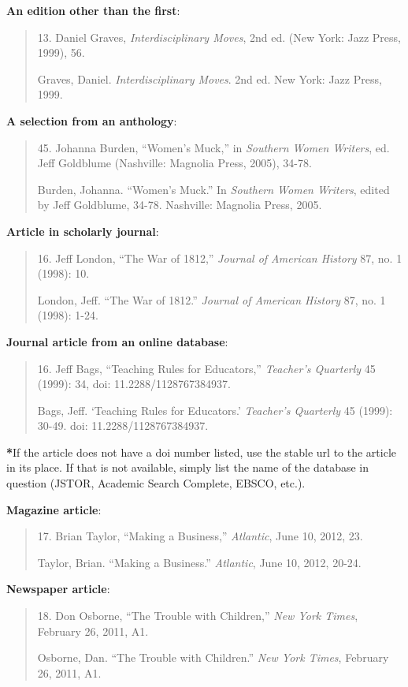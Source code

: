 \textbf{An edition other than the first}:

\begin{quote}
 13. Daniel Graves, \emph{Interdisciplinary Moves}, 2nd ed. (New York: Jazz Press, 1999), 56.

Graves, Daniel. \emph{Interdisciplinary Moves}. 2nd ed. New York: Jazz Press,  1999.
\end{quote}

\textbf{A selection from an anthology}:
\begin{quote}

 45. Johanna Burden, ``Women's Muck,'' in \emph{Southern Women Writers}, ed. Jeff Goldblume (Nashville: Magnolia Press, 2005), 34-78.

Burden, Johanna. ``Women's Muck.'' In \emph{Southern Women Writers},  edited by Jeff Goldblume, 
34-78. Nashville: Magnolia Press, 2005.
\end{quote}

\textbf{Article in scholarly journal}:
\begin{quote}
 16. Jeff London, ``The War of 1812,'' \emph{Journal of American History} 87, no. 1 (1998): 10.

London, Jeff. ``The War of 1812.'' \emph{Journal of American History} 87, no.  1 (1998): 1-24.
\end{quote}

\textbf{Journal article from an online database}:
\begin{quote}

 16. Jeff Bags, ``Teaching Rules for Educators,'' \emph{Teacher's Quarterly} 45 (1999): 34, doi: 11.2288/1128767384937.

Bags, Jeff. `Teaching Rules for Educators.' \emph{Teacher's Quarterly} 45  (1999): 30-49. doi: 11.2288/1128767384937.
\end{quote}

\textbf{*}If the article does not have a doi number listed, use the stable url to the article in its place. If that is not available, simply list the name of the database in question (JSTOR, Academic Search Complete, EBSCO, etc.).


\textbf{Magazine article}:
\begin{quote}
 17. Brian Taylor, ``Making a Business,'' \emph{Atlantic}, June 10, 2012, 23.

Taylor, Brian. ``Making a Business.'' \emph{Atlantic}, June 10, 2012, 20-24.
\end{quote}


\textbf{Newspaper article}:
\begin{quote}
 18. Don Osborne, ``The Trouble with Children,'' \emph{New York Times}, February 26, 2011, A1.

Osborne, Dan. ``The Trouble with Children.'' \emph{New York Times}, February  26, 2011, A1.
\end{quote}




